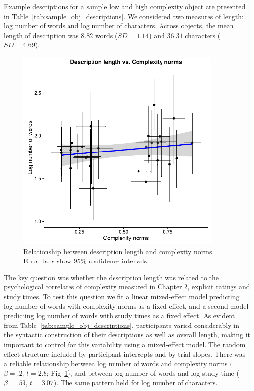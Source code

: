 Example descriptions for a sample low and high complexity object are presented in Table~\ref{tab:sample_obj_descriptions}. We considered two measures of length:  log number of words and log number of characters. Across objects, the mean length of description was  $8.82$ words ($SD = 1.14$) and $36.31$ characters ($SD = 4.69$).

 \begin{figure}[t!]
 \begin{center}
  \includegraphics[width=4in]{figs/desc_length_word.pdf}
  \caption{\label{fig:desc_length} Relationship between description length and complexity norms. Error bars show  95\% confidence intervals.}
 \end{center}
\end{figure}


The key question was whether the description length was related to the psychological correlates of complexity measured in Chapter 2, explicit ratings and study times.
To test this question we fit a  linear mixed-effect model predicting log number of words with complexity norms as a fixed effect, and a second model predicting log number of words with study times as a fixed effect. As evident from Table~\ref{tab:sample_obj_descriptions}, participants varied considerably in the  syntactic construction of their descriptions as well as overall  length, making it important to control for this variability using a  mixed-effect model. The random effect structure included by-participant intercepts and by-trial slopes. There was a reliable relationship between log number of words and  complexity norms ($\beta=.2$, $t =2.8$; Fig~\ref{fig:desc_length}), and between log number of words and log study time ($\beta=.59$, $t =3.07$). The same pattern held for log number of characters. 

